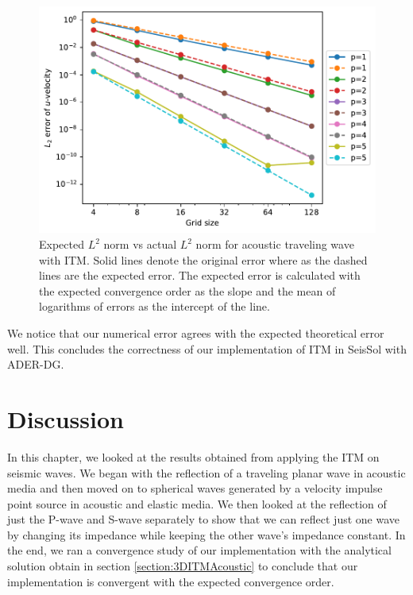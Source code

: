 \begin{figure}[htpb]
    \centering
    \includegraphics[width=0.75\linewidth]{figures/error3.pdf}
    \caption{Expected $L^2$ norm vs actual $L^2$ norm for acoustic traveling wave with \ac{ITM}. Solid lines denote the original error where as the dashed lines are the expected error. The expected error is calculated with the expected convergence order
    as the slope and the mean of logarithms of errors as the intercept of the line.}
    \label{fig:expectedvsactualerror}
\end{figure}

We notice that our numerical error agrees with the expected theoretical error well. This concludes the correctness of our implementation of \ac{ITM} in SeisSol with \ac{ADER}-\ac{DG}.

\section{Discussion}
In this chapter, we looked at the results obtained from applying the \ac{ITM} on seismic waves. We began with the reflection of a traveling planar wave in acoustic media
and then moved on to spherical waves generated by a velocity impulse point source in acoustic and elastic media. 
We then looked at the reflection of just the P-wave and S-wave separately to show that we can reflect just one wave by changing its impedance while keeping the other wave's impedance constant.
In the end, we ran a convergence study of our implementation with the analytical solution obtain in section \ref{section:3DITMAcoustic} to conclude that our implementation
is convergent with the expected convergence order. \\